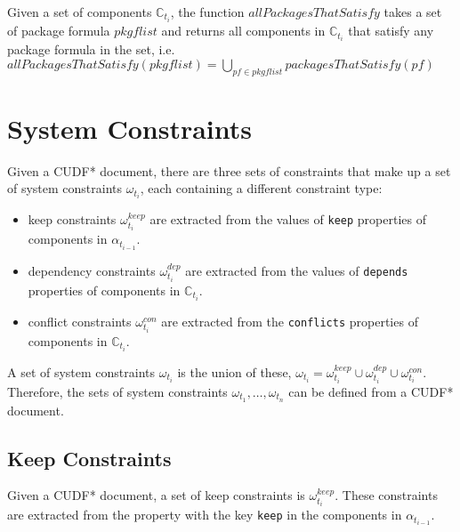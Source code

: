 \begin{defs}
Given a set of components $\mathbb{C}_{t_i}$,
the function $allPackagesThatSatisfy$ takes a set of package formula $pkgflist$ and returns all components in $\mathbb{C}_{t_i}$ that satisfy any package formula in the set,
i.e. $allPackagesThatSatisfy(pkgflist) = \bigcup \limits_{pf \in pkgflist} packagesThatSatisfy(pf)$ 
\end{defs}

\section{System Constraints}
Given a CUDF* document, there are three sets of constraints that make up a set of system constraints $\omega_{t_i}$, each containing a different constraint type:
\begin{itemize}
  \item keep constraints $\omega_{t_i}^{keep}$ are extracted from the values of \verb+keep+ properties of components in $\alpha_{t_{i-1}}$.
  \item dependency constraints $\omega_{t_i}^{dep}$ are extracted from the values of \verb+depends+ properties of components in $\mathbb{C}_{t_i}$.
  \item conflict constraints $\omega_{t_i}^{con}$ are extracted from the \verb+conflicts+ properties of components in $\mathbb{C}_{t_i}$.
\end{itemize}
A set of system constraints $\omega_{t_i}$ is the union of these,
$\omega_{t_i} =  \omega_{t_i}^{keep} \cup \omega_{t_i}^{dep} \cup \omega_{t_i}^{con}$.
Therefore, the sets of system constraints $\omega_{t_1},\ldots,\omega_{t_n}$ can be defined from a CUDF* document.

\subsection{Keep Constraints}
Given a CUDF* document, a set of keep constraints is $\omega_{t_i}^{keep}$.
These constraints are extracted from the property with the key \texttt{keep} in the components in $\alpha_{t_{i-1}}$.

